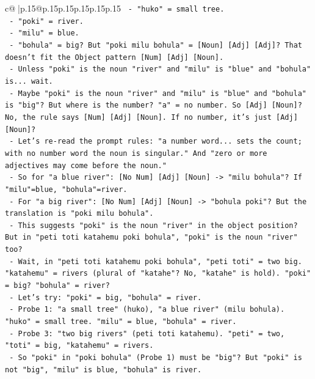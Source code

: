 \documentclass{article}
\begin{document}
{\begin{supertabular}{c@{$\;$}|p{.15\linewidth}@{}p{.15\linewidth}p{.15\linewidth}p{.15\linewidth}p{.15\linewidth}p{.15\linewidth}}
{{{\texttt{              {-} "huko" = small tree.} \\
\texttt{              {-} "poki" = river.} \\
\texttt{              {-} "milu" = blue.} \\
\texttt{              {-} "bohula" = big? But "poki milu bohula" = {[}Noun{]} {[}Adj{]} {[}Adj{]}? That doesn't fit the Object pattern {[}Num{]} {[}Adj{]} {[}Noun{]}.} \\
\texttt{              {-} Unless "poki" is the noun "river" and "milu" is "blue" and "bohula" is... wait.} \\
\texttt{              {-} Maybe "poki" is the noun "river" and "milu" is "blue" and "bohula" is "big"? But where is the number? "a" = no number. So {[}Adj{]} {[}Noun{]}? No, the rule says {[}Num{]} {[}Adj{]} {[}Noun{]}. If no number, it's just {[}Adj{]} {[}Noun{]}?} \\
\texttt{              {-} Let's re{-}read the prompt rules: "a number word... sets the count; with no number word the noun is singular." And "zero or more adjectives may come before the noun."} \\
\texttt{              {-} So for "a blue river": {[}No Num{]} {[}Adj{]} {[}Noun{]} {-}> "milu bohula"? If "milu"=blue, "bohula"=river.} \\
\texttt{              {-} For "a big river": {[}No Num{]} {[}Adj{]} {[}Noun{]} {-}> "bohula poki"? But the translation is "poki milu bohula".} \\
\texttt{              {-} This suggests "poki" is the noun "river" in the object position? But in "peti toti katahemu poki bohula", "poki" is the noun "river" too?} \\
\texttt{              {-} Wait, in "peti toti katahemu poki bohula", "peti toti" = two big. "katahemu" = rivers (plural of "katahe"? No, "katahe" is hold). "poki" = big? "bohula" = river?} \\
\texttt{              {-} Let's try: "poki" = big, "bohula" = river.} \\
\texttt{                {-} Probe 1: "a small tree" (huko), "a blue river" (milu bohula). "huko" = small tree. "milu" = blue, "bohula" = river.} \\
\texttt{                {-} Probe 3: "two big rivers" (peti toti katahemu). "peti" = two, "toti" = big, "katahemu" = rivers.} \\
\texttt{                {-} So "poki" in "poki bohula" (Probe 1) must be "big"? But "poki" is not "big", "milu" is blue, "bohula" is river.} \\
}}}
\end{supertabular}}
\end{document}
